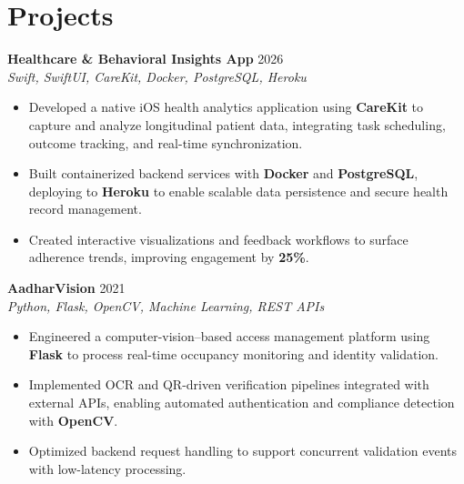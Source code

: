 \documentclass[letterpaper,11pt]{article}
\begin{document}
\section*{Projects}
\textbf{Healthcare \& Behavioral Insights App} \hfill 2026 \\
\textit{Swift, SwiftUI, CareKit, Docker, PostgreSQL, Heroku}
\begin{itemize}[noitemsep]
    \item Developed a native iOS health analytics application using \textbf{CareKit} to capture and analyze longitudinal patient data, integrating task scheduling, outcome tracking, and real-time synchronization.
    \item Built containerized backend services with \textbf{Docker} and \textbf{PostgreSQL}, deploying to \textbf{Heroku} to enable scalable data persistence and secure health record management.
    \item Created interactive visualizations and feedback workflows to surface adherence trends, improving engagement by \textbf{25\%}.
\end{itemize}
\textbf{AadharVision} \hfill 2021 \\
\textit{Python, Flask, OpenCV, Machine Learning, REST APIs}
\begin{itemize}[noitemsep]
    \item Engineered a computer-vision–based access management platform using \textbf{Flask} to process real-time occupancy monitoring and identity validation.
    \item Implemented OCR and QR-driven verification pipelines integrated with external APIs, enabling automated authentication and compliance detection with \textbf{OpenCV}.
    \item Optimized backend request handling to support concurrent validation events with low-latency processing.
\end{itemize}
\end{document}
